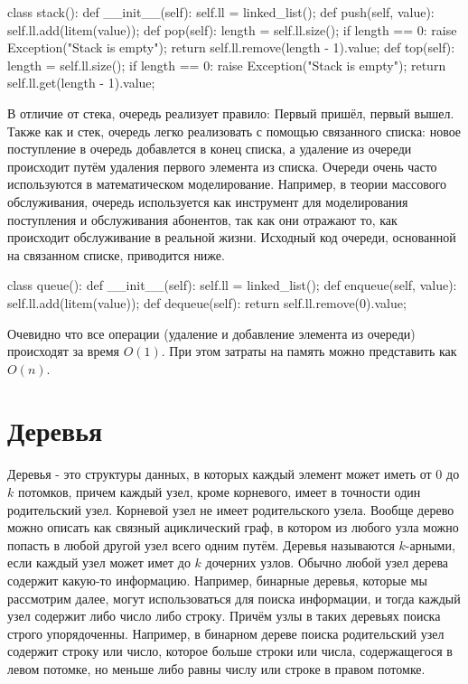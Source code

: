 \begin{python}
class stack():
	def __init__(self):
		self.ll = linked_list();
	def push(self, value):
		self.ll.add(litem(value));
	def pop(self):
		length = self.ll.size();
		if length == 0:
			raise Exception("Stack is empty");
		return self.ll.remove(length - 1).value;
	def top(self):
		length = self.ll.size();
		if length == 0:
			raise Exception("Stack is empty");
		return self.ll.get(length - 1).value;
\end{python}

В отличие от стека, очередь реализует правило: Первый пришёл, первый 
вышел. Также как и стек, очередь легко реализовать с помощью связанного
списка: новое поступление в очередь добавлется в конец списка, 
а удаление из очереди происходит путём удаления первого элемента из
списка. Очереди очень часто используются в математическом моделирование. 
Например, в теории массового обслуживания, очередь используется как 
инструмент для моделирования поступления и обслуживания абонентов, 
так как они отражают то, как происходит обслуживание в реальной жизни.
Исходный код очереди, основанной на связанном списке, приводится ниже.

\begin{python}
class queue():
	def __init__(self):
		self.ll = linked_list();
	def enqueue(self, value):
		self.ll.add(litem(value));
	def dequeue(self):
		return self.ll.remove(0).value;
\end{python}

Очевидно что все операции (удаление и добавление элемента из очереди)
происходят за время $O(1)$. При этом затраты на память можно представить 
как $O(n)$.

\section{Деревья}

Деревья - это структуры данных, в которых каждый элемент может иметь от $0$ 
до $k$ потомков, причем каждый узел, кроме корневого, имеет в точности один 
родительский узел. Корневой узел не имеет родительского узела. Вообще дерево можно
описать как связный ациклический граф, в котором из любого узла можно попасть в любой 
другой узел всего одним путём. Деревья называются $k$-арными, если каждый узел может 
имет до $k$ дочерних узлов. Обычно любой узел дерева содержит какую-то 
информацию. Например, бинарные деревья, которые мы рассмотрим далее, могут 
использоваться для поиска информации, и тогда каждый узел содержит либо 
число либо строку. Причём узлы в таких деревьях поиска строго упорядоченны.
Например, в бинарном дереве поиска родительский узел содержит строку или число,
которое больше строки или числа, содержащегося в левом потомке, но меньше 
либо равны числу или строке в правом потомке. 

